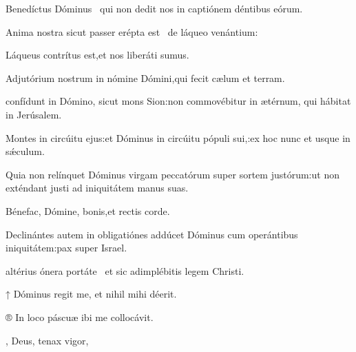 \begin{multicols}{2}
Benedíctus Dóminus \GreStar\ qui non dedit nos in captiónem déntibus eórum.

Anima nostra sicut passer erépta est \GreStar\ de láqueo venántium\thinspace:

Láqueus contrítus est,\GreStarNbsp et nos liberáti sumus.

Adjutórium nostrum in nómine Dómini,\GreStarNbsp qui fecit cælum et terram.


\vspace{-0.3cm}


\vspace{-0.1cm}

\Normal

 confídunt in Dómino, sicut mons Sion\thinspace:\GreStarNbsp non commovébitur in ætérnum, qui hábitat in Jerúsalem.

Montes in circúitu ejus\thinspace:\GreDagger et Dóminus in circúitu pópuli sui,\thinspace:\GreStarNbsp ex hoc nunc et usque in sǽculum.

Quia non relínquet Dóminus virgam peccatórum super sortem justórum\thinspace:\GreStarNbsp ut non exténdant justi ad iniquitátem manus suas.

Bénefac, Dómine, bonis,\GreStarNbsp et rectis corde.

Declinántes autem in obligatiónes addúcet Dóminus cum operántibus iniquitátem\thinspace:\GreStarNbsp pax super Israel.



 altérius ónera portáte \GreStar\ et sic adimplébitis legem Christi.

\vspace{0.3cm}

↑ Dóminus regit me, et nihil mihi déerit.

® In loco páscuæ ibi me collocávit.



\Ligne



\vspace{0.2cm}

\Hymne{}

\setlength{\leftskip}{0cm}
, Deus, tenax vigor,


\end{multicols}
